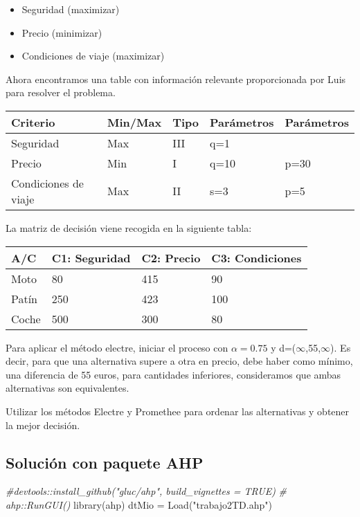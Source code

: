 \documentclass[
]{article}
\newenvironment{Shaded}{\begin{snugshade}}{\end{snugshade}}
\newcommand{\CommentTok}[1]{\textcolor[rgb]{0.56,0.35,0.01}{\textit{#1}}}
\newcommand{\FunctionTok}[1]{\textcolor[rgb]{0.00,0.00,0.00}{#1}}
\newcommand{\NormalTok}[1]{#1}
\newcommand{\OtherTok}[1]{\textcolor[rgb]{0.56,0.35,0.01}{#1}}
\newcommand{\StringTok}[1]{\textcolor[rgb]{0.31,0.60,0.02}{#1}}
\providecommand{\tightlist}{%
  \setlength{\itemsep}{0pt}\setlength{\parskip}{0pt}}
\begin{document}
\begin{itemize}
\tightlist
\item
  Seguridad (maximizar)
\item
  Precio (minimizar)
\item
  Condiciones de viaje (maximizar)
\end{itemize}

Ahora encontramos una table con información relevante proporcionada por
Luis para resolver el problema.

\begin{longtable}[]{@{}lllll@{}}
\toprule
Criterio & Min/Max & Tipo & Parámetros & Parámetros \\
\midrule
\endhead
Seguridad & Max & III & q=1 & \\
Precio & Min & I & q=10 & p=30 \\
Condiciones de viaje & Max & II & s=3 & p=5 \\
\bottomrule
\end{longtable}

La matriz de decisión viene recogida en la siguiente tabla:

\begin{longtable}[]{@{}llll@{}}
\toprule
A/C & C1: Seguridad & C2: Precio & C3: Condiciones \\
\midrule
\endhead
Moto & 80 & 415 & 90 \\
Patín & 250 & 423 & 100 \\
Coche & 500 & 300 & 80 \\
\bottomrule
\end{longtable}

Para aplicar el método electre, iniciar el proceso con \(\alpha=0.75\) y
d=(\(\infty\),55,\(\infty\)). Es decir, para que una alternativa supere
a otra en precio, debe haber como mínimo, una diferencia de 55 euros,
para cantidades inferiores, consideramos que ambas alternativas son
equivalentes.

Utilizar los métodos Electre y Promethee para ordenar las alternativas y
obtener la mejor decisión.

\hypertarget{soluciuxf3n-con-paquete-ahp}{%
\subsection{Solución con paquete
AHP}\label{soluciuxf3n-con-paquete-ahp}}

\begin{Shaded}
\begin{Highlighting}[]
\CommentTok{\#devtools::install\_github("gluc/ahp", build\_vignettes = TRUE)}
\CommentTok{\# ahp::RunGUI()}
\FunctionTok{library}\NormalTok{(ahp)}
\NormalTok{dtMio }\OtherTok{=} \FunctionTok{Load}\NormalTok{(}\StringTok{"trabajo2TD.ahp"}\NormalTok{)}
\end{Highlighting}
\end{Shaded}
\end{document}
